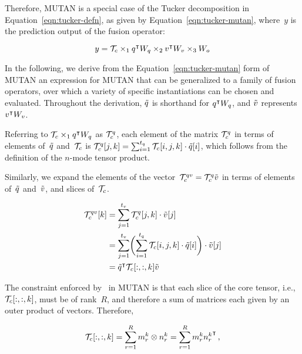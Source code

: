 Therefore, MUTAN is a special case of the Tucker decomposition in
Equation~\ref{eqn:tucker-defn}, as given by Equation~\ref{eqn:tucker-mutan},
where~$y$ is the prediction output of the fusion operator:

\begin{equation}
        y = \mathcal{T}_c \times_1
                q^\intercal{} W_{q}{} \times_2
                v^\intercal{} W_{v}{} \times_3
                W_o
        \label{eqn:tucker-mutan}
\end{equation}

In the following, we derive from the Equation~\ref{eqn:tucker-mutan} form of
MUTAN an expression for MUTAN that can be generalized to a family of fusion
operators, over which a variety of specific instantiations can be chosen and
evaluated.  Throughout the derivation, $\tilde{q}$ is shorthand for
$q^\intercal{} W_{q}{}$, and $\tilde{v}$ represents $v^\intercal{} W_{v}{}$.

Referring to $\mathcal{T}_c \times_1 q^\intercal{} W_{q}{}$ as $\mathcal{T}_c^{q}$, each element of
the matrix $\mathcal{T}_c^{q}$ in terms of elements of~$\tilde{q}$ and~$\mathcal{T}_c$ is
$\mathcal{T}_c^{q}[j, k] = \sum_{i = 1}^{t_q} \mathcal{T}_c[i, j, k] \cdot \tilde{q}[i]$,
which follows from the definition of the $n$-mode tensor product.

Similarly, we expand the elements of the
vector~$\mathcal{T}_c^{qv} = \mathcal{T}_c^{q} \tilde{v}$ in terms of elements
of~$\tilde{q}$ and~$\tilde{v}$, and slices of~$\mathcal{T}_c$.

\begin{align}
\begin{split}
        \mathcal{T}_c^{qv}[k] &= \sum_{j = 1}^{t_v} \mathcal{T}_c^{q}[j, k] \cdot \tilde{v}[j]  \\
                       &= \sum_{j = 1}^{t_v} \biggl(\sum_{i = 1}^{t_q} \mathcal{T}_c[i, j, k] \cdot \tilde{q}[i]\biggr) \cdot \tilde{v}[j]  \\
                       &= {\tilde{q}}^\intercal \mathcal{T}_c[:, :, k] \tilde{v}
\end{split}
\label{eqn:tucker-core-tensor-expanded}
\end{align}

The constraint enforced by~\cite{ben2017mutan} in MUTAN is that each slice of
the core tensor, i.e.,~$\mathcal{T}_c[:, :, k]$, must be of rank~$R$, and therefore a sum
of matrices each given by an outer product of vectors. Therefore,

\begin{equation}
        \mathcal{T}_c[:, :, k] = \sum_{r = 1}^R m_r^k \otimes n_r^k
                      = \sum_{r = 1}^R m_r^k {n_r^k}^\intercal \,,
\label{eqn:tucker-core-tensor-rank-r}
\end{equation}

